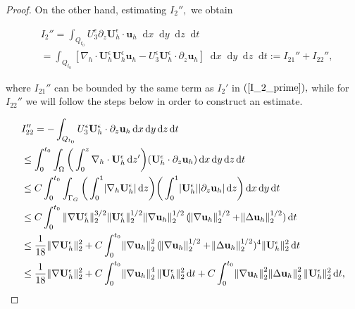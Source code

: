\documentclass[11pt]{article}
\newcommand*\diff{\mathop{}\!\mathrm{d}}
\begin{document}
\begin{proof}
  On the other hand, estimating $I_2'',$ we obtain
  
  \begin{equation}
    \begin{split}
      & I_2 '' = \int_{Q_{t_0}} U^\epsilon_3 \partial_z \mathbf{U}_h^\epsilon \cdot \mathbf{u}_h \diff x \diff y \diff z \diff t \\
      & =  \int_{Q_{t_0}} [\nabla_h \cdot \mathbf{U}_h^\epsilon \mathbf{U}_h^\epsilon \mathbf{u}_h - U^\epsilon_3 \mathbf{U}_h^\epsilon \cdot \partial_z \mathbf{u}_h ] \diff x \diff y \diff z \diff t := I_{21}'' + I_{22}'',
    \end{split}
  \end{equation}
  
  where $I_{21}''$ can be bounded by the same term as $I_2'$ in $(\ref{I_2_prime}),$ while for $I_{22}''$ we will follow the steps below in order to construct an estimate.
  
  \begin{equation} \nonumber
    \begin{split}
      & I_{22}'' = - \int_{Q_{t_0}}  U^\epsilon_3 \mathbf{U}_h^\epsilon \cdot \partial_z \mathbf{u}_h \diff x \diff y \diff z \diff t \\
      & \leq \int_0^{t_0} \int_\Omega \bigg ( \int_0^z \nabla_h \cdot \mathbf{U}_h^\epsilon \diff z' \bigg ) (\mathbf{U}_h^\epsilon \cdot \partial_z \mathbf{u}_h) \diff x \diff y \diff z \diff t \\
      & \leq C \int_0^{t_0} \int_{\Gamma_G} \bigg ( \int_0^1 \abs{\nabla_h \mathbf{U}_h^\epsilon} \diff z \bigg) \bigg ( \int_0^1 \abs{\mathbf{U}_h^\epsilon} \abs{\partial_z \mathbf{u}_h} \diff z \bigg ) \diff x \diff y \diff t \\
      & \leq C \int_0^{t_0} \| \nabla \mathbf{U}_h^\epsilon \| _2^{3/2} \| \mathbf{U}_h^\epsilon \| _2^{1/2} \norm{\nabla \mathbf{u}_h}_2^{1/2} (\norm{\nabla \mathbf{u}_h}_2^{1/2} + \norm{\Delta \mathbf{u}_h}_2^{1/2}) \diff t \\
      & \leq \frac{1}{18} \| \nabla \mathbf{U}_h^\epsilon \| ^2_2 + C \int_0^{t_0} \norm{\nabla \mathbf{u}_h}_2^2 (\norm{\nabla \mathbf{u}_h}_2^{1/2} + \norm{\Delta \mathbf{u}_h}_2^{1/2})^4 \| \mathbf{U}_h^\epsilon \|_2^2 \diff t \\
      & \leq \frac{1}{18} \| \nabla \mathbf{U}_h^\epsilon \| ^2_2 + C \int_0^{t_0} \norm{\nabla \mathbf{u}_h}_2^4 \| \mathbf{U}_h^\epsilon \|_2^2 \diff t + C \int_0^{t_0} \norm{\nabla \mathbf{u}_h}_2^2  \norm{\Delta \mathbf{u}_h}_2^2 \| \mathbf{U}_h^\epsilon \| _2^2 \diff t,
    \end{split}
  \end{equation}
  

\end{proof}
\end{document}
